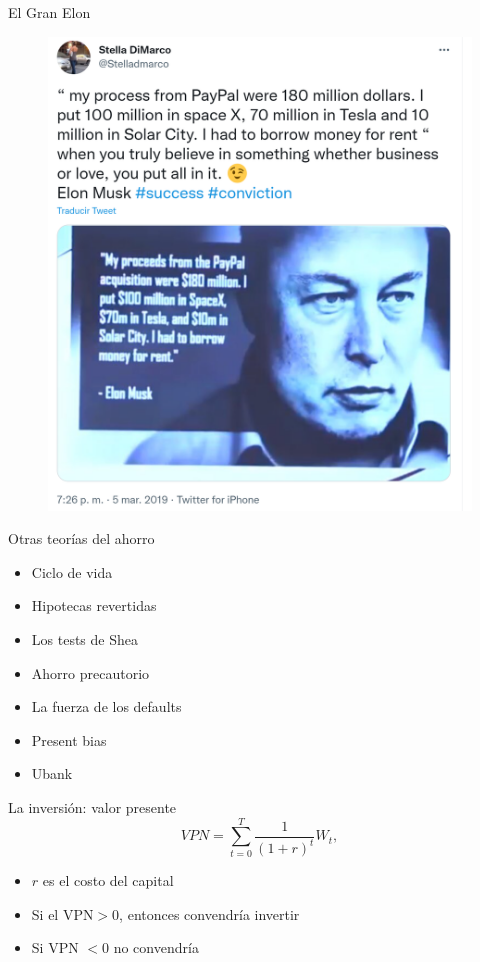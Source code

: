 \documentclass{beamer}
\begin{document}
\begin{frame}{El Gran Elon}
   \begin{figure} [H]
    \centering
    \href{https://twitter.com/Stelladmarco/status/1103059259586052097}{
    \includegraphics[scale=0.5]{Slides Principios de Economia/Figures/C31.9.png}}
\end{figure} 
\end{frame} 


\begin{frame}{Otras teorías del ahorro}
   \begin{itemize}
       \item Ciclo de vida
       \item Hipotecas revertidas
       \item Los tests de Shea
       \item Ahorro precautorio
       \item La fuerza de los defaults
       \item Present bias
       \item Ubank
   \end{itemize} 
\end{frame}


\begin{frame}{La inversión: valor presente}
    \begin{equation}
VPN = \sum_{t=0} ^{T} \frac{1}{(1+r)^t} W_t,
\end{equation}
\begin{itemize}
    \item $r$ es el costo del capital 
    \item Si el VPN$>0$, entonces convendría invertir
    \item Si VPN $<0$ no convendría
\end{itemize}
\end{frame}
\end{document}
